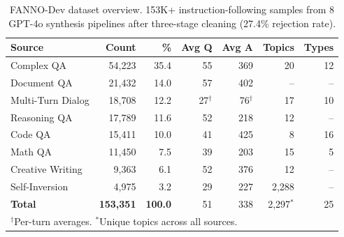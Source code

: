 \begin{table}[t]
\centering
\caption{FANNO-Dev dataset overview. 153K+ instruction-following samples from 8 GPT-4o synthesis pipelines after three-stage cleaning (27.4\% rejection rate).}
\label{tab:dataset_stats}
\small
\begin{tabular}{lrrrrrr}
\toprule
\textbf{Source} & \textbf{Count} & \textbf{\%} & \textbf{Avg Q} & \textbf{Avg A} & \textbf{Topics} & \textbf{Types} \\
\midrule
Complex QA & 54,223 & 35.4 & 55 & 369 & 20 & 12 \\
Document QA & 21,432 & 14.0 & 57 & 402 & -- & -- \\
Multi-Turn Dialog & 18,708 & 12.2 & 27$^\dagger$ & 76$^\dagger$ & 17 & 10 \\
Reasoning QA & 17,789 & 11.6 & 52 & 218 & 12 & -- \\
Code QA & 15,411 & 10.0 & 41 & 425 & 8 & 16 \\
Math QA & 11,450 & 7.5 & 39 & 203 & 15 & 5 \\
Creative Writing & 9,363 & 6.1 & 52 & 376 & 12 & -- \\
Self-Inversion & 4,975 & 3.2 & 29 & 227 & 2,288 & -- \\
\midrule
\textbf{Total} & \textbf{153,351} & \textbf{100.0} & 51 & 338 & 2,297$^*$ & 25 \\
\bottomrule
\multicolumn{7}{l}{\footnotesize $^\dagger$Per-turn averages. $^*$Unique topics across all sources.} \\
\end{tabular}
\end{table}